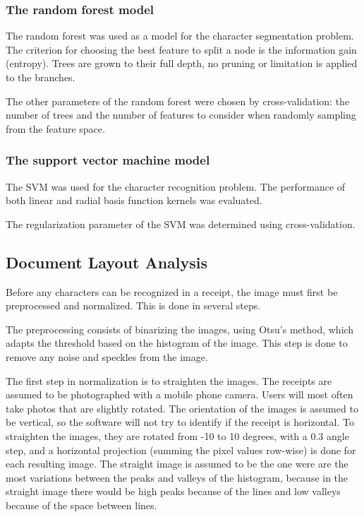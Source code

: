 \subsubsection{The random forest model}
The random forest was used as a model for the character segmentation problem. The criterion for choosing the best feature to split a node is the information gain (entropy). Trees are grown to their full depth, no pruning or limitation is applied to the branches. 

The other parameters of the random forest were chosen by cross-validation: the number of trees and the number of features to consider when randomly sampling from the feature space. 

\subsubsection{The support vector machine model}
The SVM was used for the character recognition problem. The performance of both linear and radial basis function kernels was evaluated. 

The regularization parameter of the SVM was determined using cross-validation. 

\subsection{Document Layout Analysis}
Before any characters can be recognized in a receipt, the image must first be preprocessed and normalized. This is done in several steps. 

The preprocessing consists of binarizing the images, using Otsu's method\cite{otsu1975threshold}, which adapts the threshold based on the histogram of the image. This step is done to remove any noise and speckles from the image. 

The first step in normalization is to straighten the images. The receipts are assumed to be photographed with a mobile phone camera. Users will most often take photos that are slightly rotated. The orientation of the images is assumed to be vertical, so the software will not try to identify if the receipt is horizontal. To straighten the images, they are rotated from -10 to 10 degrees, with a 0.3 angle step, and a horizontal projection (summing the pixel values row-wise) is done for each resulting image. The straight image is assumed to be the one were are the most variations between the peaks and valleys of the histogram, because in the straight image there would be high peaks because of the lines and low valleys because of the space between lines. 

